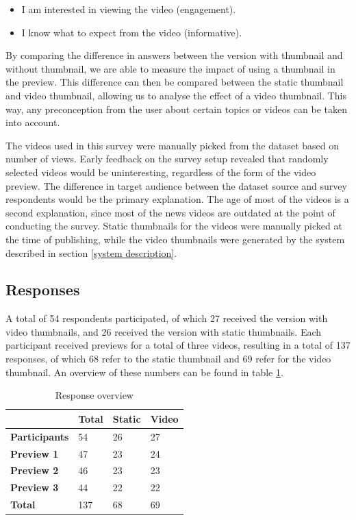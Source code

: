 \documentclass{../resources/sig-alternate-05-2015}
\begin{document}
\begin{itemize}
	\item I am interested in viewing the video (engagement).
	\item I know what to expect from the video (informative).
\end{itemize}

By comparing the difference in answers between the version with thumbnail and without thumbnail, we are able to measure the impact of using a thumbnail in the preview. This difference can then be compared between the static thumbnail and video thumbnail, allowing us to analyse the effect of a video thumbnail. This way, any preconception from the user about certain topics or videos can be taken into account.

The videos used in this survey were manually picked from the dataset based on number of views. Early feedback on the survey setup revealed that randomly selected videos would be uninteresting, regardless of the form of the video preview. The difference in target audience between the dataset source and survey respondents would be the primary explanation. The age of most of the videos is a second explanation, since most of the news videos are outdated at the point of conducting the survey. Static thumbnails for the videos were manually picked at the time of publishing, while the video thumbnails were generated by the system described in section \ref{system description}.

\subsection{Responses}

A total of 54 respondents participated, of which 27 received the version with video thumbnails, and 26 received the version with static thumbnails. Each participant received previews for a total of three videos, resulting in a total of 137 responses, of which 68 refer to the static thumbnail and 69 refer for the video thumbnail. An overview of these numbers can be found in table \ref{number of responses table}.

\begin{table}[h]
\centering
\caption{Response overview}
\label{number of responses table}
\begin{tabular}{@{}llll@{}}
\textbf{}             & \textbf{Total} & \textbf{Static} & \textbf{Video} \\ \toprule
\textbf{Participants} & 54             & 26              & 27             \\ \midrule
\textbf{Preview 1}    & 47             & 23              & 24             \\
\textbf{Preview 2}    & 46             & 23              & 23             \\
\textbf{Preview 3}    & 44             & 22              & 22             \\ \bottomrule
\textbf{Total}        & 137            & 68              & 69             \\
\end{tabular}
\end{table}
\end{document}
